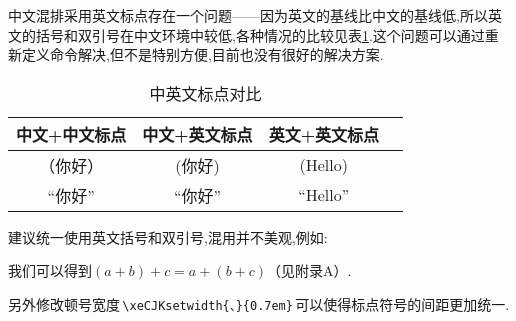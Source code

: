 \documentclass[a4paper]{article}
\newcommand{\sref}[1]{\CJKecglue\ref{#1}}
\begin{document}
中文混排采用英文标点存在一个问题——因为英文的基线比中文的基线低,所以英文的括号和双引号在中文环境中较低,各种情况的比较见表\sref{tab:bdfh}.这个问题可以通过重新定义命令解决,但不是特别方便,目前也没有很好的解决方案.\eop
\begin{table}[h]
	\centering
	\caption{中英文标点对比}\label{tab:bdfh}
	\begin{tabular}{cccc}
		\toprule
		中文+中文标点 & 中文+英文标点 & 英文+英文标点 \\ \hline
		（你好）      & (你好)        & (Hello)       \\
		“你好”        & ``你好''      & ``Hello''     \\
		\bottomrule
	\end{tabular}
\end{table}

建议统一使用英文括号和双引号,混用并不美观,例如:\eop

\centerline{我们可以得到$(a+b)+c=a+(b+c)$（见附录A）\!.}

另外修改顿号宽度\,\verb|\xeCJKsetwidth{、}{0.7em}|\,可以使得标点符号的间距更加统一.\eop
\end{document}
